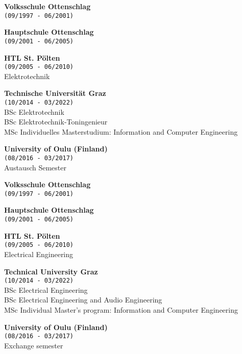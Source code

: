 
{


\textbf{Volksschule Ottenschlag}\\
\texttt{(09/1997 - 06/2001)}

\textbf{Hauptschule Ottenschlag}\\
\texttt{(09/2001 - 06/2005)}

\textbf{HTL St. Pölten}\\
\texttt{(09/2005 - 06/2010)}\\
Elektrotechnik

\textbf{Technische Universität Graz}\\
\texttt{(10/2014 - 03/2022)}\\
BSc Elektrotechnik\\
BSc Elektrotechnik-Toningenieur\\
MSc Individuelles Masterstudium: Information and Computer Engineering

\textbf{University of Oulu (Finland)}\\
\texttt{(08/2016 - 03/2017)}\\
Austausch Semester\\
}
{


\textbf{Volksschule Ottenschlag}\\
\texttt{(09/1997 - 06/2001)}

\textbf{Hauptschule Ottenschlag}\\
\texttt{(09/2001 - 06/2005)}

\textbf{HTL St. Pölten}\\
\texttt{(09/2005 - 06/2010)}\\
Electrical Engineering

\textbf{Technical University Graz}\\
\texttt{(10/2014 - 03/2022)}\\
BSc Electrical Engineering\\
BSc Electrical Engineering and Audio Engineering\\
MSc Individual Master's program: Information and Computer Engineering

\textbf{University of Oulu (Finland)}\\
\texttt{(08/2016 - 03/2017)}\\
Exchange semester\\
}